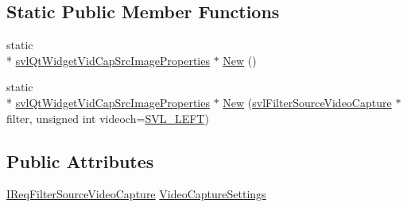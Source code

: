 \subsection*{Static Public Member Functions}
\begin{DoxyCompactItemize}
\item 
static \\*
\hyperlink{classsvl_qt_widget_vid_cap_src_image_properties}{svl\-Qt\-Widget\-Vid\-Cap\-Src\-Image\-Properties} $\ast$ \hyperlink{classsvl_qt_widget_vid_cap_src_image_properties_af30f99af8fd9c68aaf22f30bee11e0dc}{New} ()
\item 
static \\*
\hyperlink{classsvl_qt_widget_vid_cap_src_image_properties}{svl\-Qt\-Widget\-Vid\-Cap\-Src\-Image\-Properties} $\ast$ \hyperlink{classsvl_qt_widget_vid_cap_src_image_properties_aded9d5e95e0cfbadbe02637bad07942c}{New} (\hyperlink{classsvl_filter_source_video_capture}{svl\-Filter\-Source\-Video\-Capture} $\ast$filter, unsigned int videoch=\hyperlink{svl_definitions_8h_ab9fec7615f19c8df2919eebcab0b187f}{S\-V\-L\-\_\-\-L\-E\-F\-T})
\end{DoxyCompactItemize}
\subsection*{Public Attributes}
\begin{DoxyCompactItemize}
\item 
\hyperlink{class_i_req_filter_source_video_capture}{I\-Req\-Filter\-Source\-Video\-Capture} \hyperlink{classsvl_qt_widget_vid_cap_src_image_properties_afbb8469c066f6acc9cc475f32cca47e6}{Video\-Capture\-Settings}
\end{DoxyCompactItemize}
